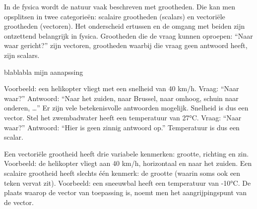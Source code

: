 \documentclass{ximera}
\begin{document}
	\author{Bart Lambregs}
    \xmsource\xmuitleg


	In de fysica wordt de natuur vaak beschreven met grootheden. Die kan men opsplitsen in twee categorieën: scalaire grootheden (scalars) en vectoriële grootheden (vectoren). 
	Het onderscheid ertussen en de omgang met beiden zijn ontzettend belangrijk in fysica.
	Grootheden die de vraag kunnen oproepen: “Naar waar gericht?” zijn vectoren, grootheden waarbij die vraag geen antwoord heeft, zijn scalars. 


	blablabla mijn aanapssing 

	
	Voorbeeld: een helikopter vliegt met een snelheid van 40 km/h. 
	Vraag: “Naar waar?” Antwoord: “Naar het zuiden, naar Brussel, naar omhoog, schuin naar onderen, …” 
	Er zijn vele betekenisvolle antwoorden mogelijk. 
	Snelheid is dus een vector. 
	Stel het zwembadwater heeft een temperatuur van 27°C. 
	Vraag: “Naar waar?” Antwoord: “Hier is geen zinnig antwoord op.” 
	Temperatuur is dus een scalar.

	Een vectoriële grootheid heeft drie variabele kenmerken: grootte, richting en zin. 
	Voorbeeld: de helikopter vliegt aan 40 km/h, horizontaal en naar het zuiden. 
	Een scalaire grootheid heeft slechts één kenmerk: de grootte (waarin soms ook een teken vervat zit). 
	Voorbeeld: een sneeuwbal heeft een temperatuur van -10°C.
	De plaats waarop de vector van toepassing is, noemt men het aangrijpingspunt van de vector.
	

	
\end{document}
